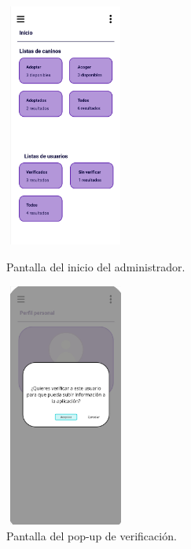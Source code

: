 \documentclass[a4paper, 12pt]{article}
\begin{document}
\begin{figure}[H]
   	\begin{minipage}{0.48\textwidth}
		\begin{center}
			{\includegraphics[height=8cm, width=4cm]{design/AdminPage.jpg}\par}
			\caption{Pantalla del inicio del administrador.}
			\medskip
		\end{center}  
	\end{minipage}\hfill
   	\begin{minipage}{0.48\textwidth}
		\begin{center}
			{\includegraphics[height=8cm, width=4cm]{design/VerifyAction.jpg}\par}
			\caption{Pantalla del pop-up de verificación.}
			\medskip
		\end{center}  
	\end{minipage}\hfill
\end{figure}
\end{document}
